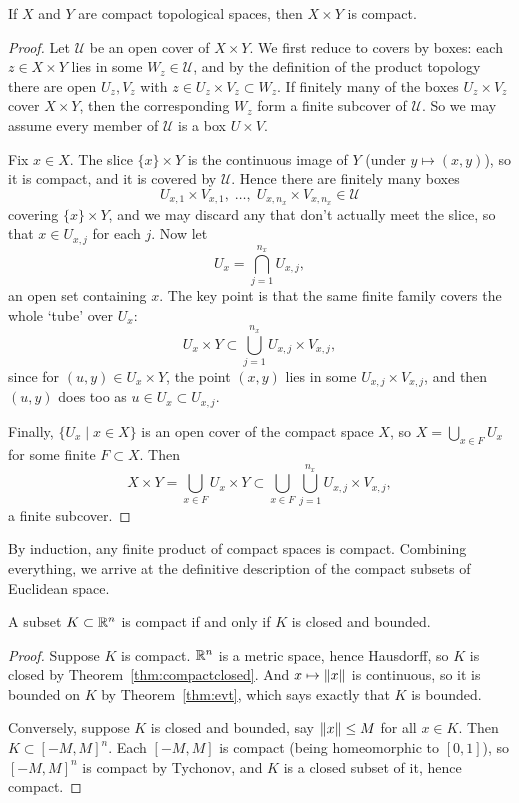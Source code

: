 \documentclass[a4paper]{scrartcl}
\begin{document}
\begin{theorem}\label{thm:tychonov}
    If $X$ and $Y$ are compact topological spaces, then $X \times Y$ is compact.
\end{theorem}
\begin{proof}
    Let $\mathcal{U}$ be an open cover of $X \times Y$. We first reduce to covers by boxes: each $z \in X \times Y$ lies in some $W_z \in \mathcal{U}$, and by the definition of the product topology there are open $U_z, V_z$ with $z \in U_z \times V_z \subset W_z$. If finitely many of the boxes $U_z \times V_z$ cover $X \times Y$, then the corresponding $W_z$ form a finite subcover of $\mathcal{U}$. So we may assume every member of $\mathcal{U}$ is a box $U \times V$.

    Fix $x \in X$. The slice $\{x\} \times Y$ is the continuous image of $Y$ (under $y \mapsto (x, y)$), so it is compact, and it is covered by $\mathcal{U}$. Hence there are finitely many boxes
    $$
    U_{x, 1} \times V_{x, 1}, \; \dots, \; U_{x, n_x} \times V_{x, n_x} \in \mathcal{U}
    $$
    covering $\{x\} \times Y$, and we may discard any that don't actually meet the slice, so that $x \in U_{x, j}$ for each $j$. Now let
    $$
    U_x = \bigcap_{j = 1}^{n_x} U_{x, j},
    $$
    an open set containing $x$. The key point is that the same finite family covers the whole `tube' over $U_x$:
    $$
    U_x \times Y \subset \bigcup_{j = 1}^{n_x} U_{x, j} \times V_{x, j},
    $$
    since for $(u, y) \in U_x \times Y$, the point $(x, y)$ lies in some $U_{x, j} \times V_{x, j}$, and then $(u, y)$ does too as $u \in U_x \subset U_{x,j}$.

    Finally, $\{U_x \mid x \in X\}$ is an open cover of the compact space $X$, so $X = \bigcup_{x \in F} U_x$ for some finite $F \subset X$. Then
    $$
    X \times Y = \bigcup_{x \in F} U_x \times Y \subset \bigcup_{x \in F} \bigcup_{j = 1}^{n_x} U_{x, j} \times V_{x, j},
    $$
    a finite subcover.
\end{proof}

By induction, any finite product of compact spaces is compact. Combining everything, we arrive at the definitive description of the compact subsets of Euclidean space.

\begin{theorem}
    A subset $K \subset \mathbb{R}^n$ is compact if and only if $K$ is closed and bounded.
\end{theorem}
\begin{proof}
    Suppose $K$ is compact. $\mathbb{R}^n$ is a metric space, hence Hausdorff, so $K$ is closed by Theorem~\ref{thm:compactclosed}. And $x \mapsto \norm{x}$ is continuous, so it is bounded on $K$ by Theorem~\ref{thm:evt}, which says exactly that $K$ is bounded.

    Conversely, suppose $K$ is closed and bounded, say $\norm{x} \leq M$ for all $x \in K$. Then $K \subset [-M, M]^n$. Each $[-M, M]$ is compact (being homeomorphic to $[0, 1]$), so $[-M, M]^n$ is compact by Tychonov, and $K$ is a closed subset of it, hence compact.
\end{proof}
\end{document}
